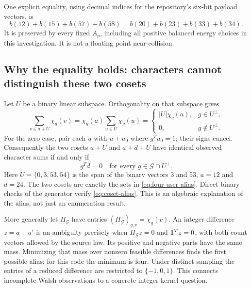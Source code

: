 \documentclass[10pt,a4paper]{article}
\begin{document}
One explicit equality, using decimal indices for the repository's six-bit payload vectors, is
\begin{equation}
 b(12)+b(15)+b(57)+b(58)
 =b(20)+b(23)+b(33)+b(34).
 \label{eq:four-user-alias}
\end{equation}
It is preserved by every fixed $A_p$, including all positive balanced energy choices in this investigation.
It is not a floating point near-collision.

\subsection{Why the equality holds: characters cannot distinguish these two cosets}
Let $U$ be a binary linear subspace. Orthogonality on that subspace gives
\[
 \sum_{v\in a+U}\chi_g(v)
 =\chi_g(a)\sum_{u\in U}\chi_g(u)
 =\begin{cases}|U|\chi_g(a),&g\in U^\perp,\\0,&g\notin U^\perp.\end{cases}
\]
For the zero case, pair each $u$ with $u+u_0$ where $g^Tu_0=1$; their signs cancel.
Consequently the two cosets $a+U$ and $a+d+U$ have identical observed character sums if and only if
\begin{equation}
 g^Td=0\quad\text{for every }g\in\mathcal G\cap U^\perp.
 \label{eq:coset-alias}
\end{equation}
Here $U=\{0,3,53,54\}$ is the span of the binary vectors 3 and 53, $a=12$ and $d=24$.
The two cosets are exactly the sets in \eqref{eq:four-user-alias}.
Direct binary checks of the generator verify \eqref{eq:coset-alias}.
This is an algebraic explanation of the alias, not just an enumeration result.

More generally let $H_{\mathcal G}$ have entries $(H_{\mathcal G})_{g,v}=\chi_g(v)$.
An integer difference $z=a-a'$ is an ambiguity precisely when
$H_{\mathcal G}z=0$ and $\mathbf{1}^Tz=0$, with both count vectors allowed by the source law.
Its positive and negative parts have the same mass. Minimizing that mass over nonzero feasible differences
finds the first possible alias; for this code the minimum is four. Under distinct sampling the entries of a
reduced difference are restricted to $\{-1,0,1\}$.
This connects incomplete Walsh observations to a concrete integer-kernel question.

\clearpage
\end{document}
